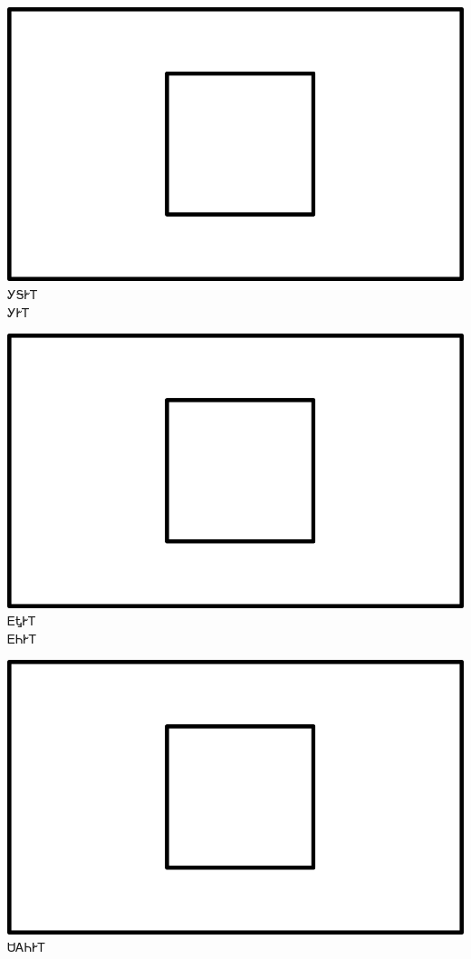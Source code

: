 \documentclass[avery5371]{flashcards}%
\begin{document}
    \begin{flashcard}{
        \includegraphics[width=0.95\columnwidth,height=.51\columnwidth,keepaspectratio]{../artwork/for-colors/square-white}
    }
        \Huge ᎩᎦᎨᎢ\\ᎩᎨᎢ
    \end{flashcard}

    \begin{flashcard}{
        \includegraphics[width=0.95\columnwidth,height=.51\columnwidth,keepaspectratio]{../artwork/for-colors/square-white}
    }
        \Huge ᎬᎿᎨᎢ\\ᎬᏂᎨᎢ
    \end{flashcard}

    \begin{flashcard}{
        \includegraphics[width=0.95\columnwidth,height=.51\columnwidth,keepaspectratio]{../artwork/for-colors/square-white}
    }
        \Huge ᏌᎪᏂᎨᎢ
    \end{flashcard}
\end{document}
